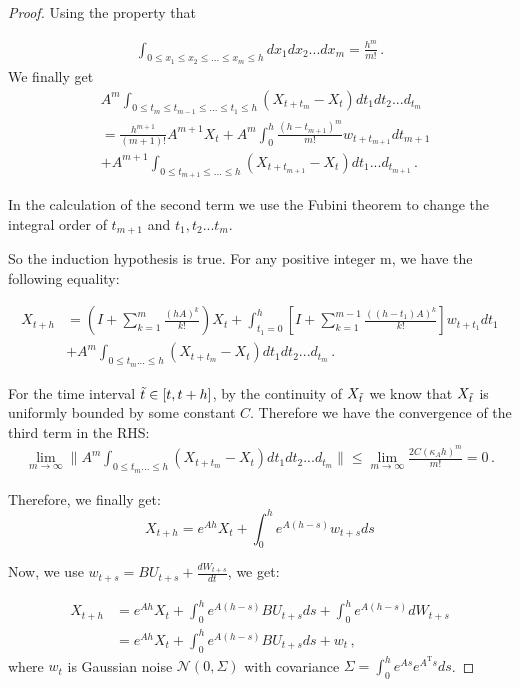 \documentclass{article}
\theoremstyle{definition}
\begin{document}
\begin{proof}
Using the property that

\begin{align*}
    \int_{0\le x_{1} \le x_{2} \le ... \le x_{m}\le h}dx_{1}dx_{2}...dx_{m}=\frac{h^{m}}{m!} \,.
\end{align*}
We finally get
\begin{align*}
    &A^{m}\int_{0\le t_{m} \le t_{m-1} \le ...\le t_1 \le h}(X_{t+t_{m}}-X_{t})dt_{1}dt_{2}...d_{t_{m}}\\
&=\frac{h^{m+1}}{(m+1)!}A^{m+1}X_{t}+A^{m}\int_{0}^{h}\frac{{(h-t_{m+1})}^{m}}{m!}w_{t+t_{m+1}}dt_{m+1}\\
&+A^{m+1}\int_{0\le t_{m+1}\le ... \le h}(X_{t+t_{m+1}}-X_{t})dt_{1}...d_{t_{m+1}} \,.
\end{align*}

In the calculation of the second term we use the Fubini theorem to change the integral order of $t_{m+1}$ and $t_1, t_2... t_m$.

So the induction hypothesis is true. For any positive integer m, we have the following equality: 

\begin{align*}
    X_{t+h} &= (I+\sum_{k=1}^{m}\frac{(hA)^{k}}{k!})X_{t}+\int_{t_{1}=0}^{h}[I+\sum_{k=1}^{m-1}\frac{{((h-t_{1})A)}^{k}}{k!}]w_{t+t_{1}}dt_{1}\\
&+A^{m}\int_{0\le t_{m}...\le h}(X_{t+t_{m}}-X_{t})dt_{1}dt_{2}...d_{t_{m}} \,.
\end{align*}

For the time interval $\Tilde{t} \in [t, t+h]$, by the continuity of $X_{\Tilde{t}}$ we know that 
$X_{\Tilde{t}}$ is uniformly bounded by some constant $C$. Therefore we have the convergence of the third term in the RHS:
\begin{align*}
    \lim_{m \rightarrow \infty} \|A^{m}\int_{0\le t_{m}...\le h}(X_{t+t_{m}}-X_{t})dt_{1}dt_{2}...d_{t_{m}} \| \le  \lim_{m \rightarrow \infty} \frac{2C (\kappa_A h)^m}{m!} = 0 \,.
\end{align*}

Therefore, we finally get:
\begin{equation}
X_{t+h} = e^{Ah}X_{t}+\int_{0}^{h}e^{A(h-s)}w_{t+s}ds
\end{equation}

Now, we use $w_{t+s} = BU_{t+s}+\frac{dW_{t+s}}{dt}$, we get:

\begin{align}
X_{t+h} &= e^{Ah}X_{t}+\int_{0}^{h}e^{A(h-s)}BU_{t+s}d{s}+\int_{0}^{h}e^{A(h-s)}dW_{t+s} \\
&= e^{Ah}X_{t}+\int_{0}^{h}e^{A(h-s)}BU_{t+s}d{s} + w_t \,,
\end{align}
where $w_{t}$ is Gaussian noise $\mathcal{N}(0, \Sigma)$ with covariance $\Sigma = \int_{0}^{h}e^{As}e^{A^{\mathrm{T}}s}ds$.

\end{proof}
\end{document}
